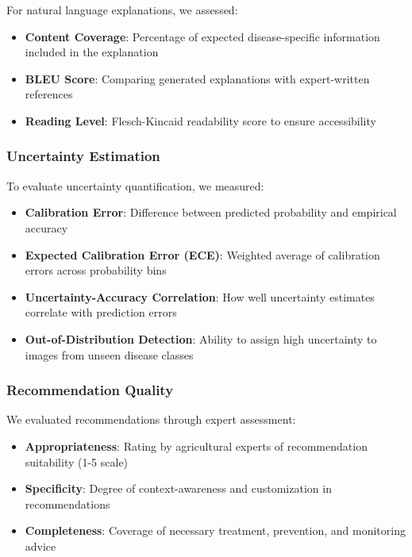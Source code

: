 For natural language explanations, we assessed:

\begin{itemize}
    \item \textbf{Content Coverage}: Percentage of expected disease-specific information included in the explanation
    \item \textbf{BLEU Score}: Comparing generated explanations with expert-written references
    \item \textbf{Reading Level}: Flesch-Kincaid readability score to ensure accessibility
\end{itemize}

\subsubsection{Uncertainty Estimation}

To evaluate uncertainty quantification, we measured:

\begin{itemize}
    \item \textbf{Calibration Error}: Difference between predicted probability and empirical accuracy
    \item \textbf{Expected Calibration Error (ECE)}: Weighted average of calibration errors across probability bins
    \item \textbf{Uncertainty-Accuracy Correlation}: How well uncertainty estimates correlate with prediction errors
    \item \textbf{Out-of-Distribution Detection}: Ability to assign high uncertainty to images from unseen disease classes
\end{itemize}

\subsubsection{Recommendation Quality}

We evaluated recommendations through expert assessment:

\begin{itemize}
    \item \textbf{Appropriateness}: Rating by agricultural experts of recommendation suitability (1-5 scale)
    \item \textbf{Specificity}: Degree of context-awareness and customization in recommendations
    \item \textbf{Completeness}: Coverage of necessary treatment, prevention, and monitoring advice
\end{itemize}


